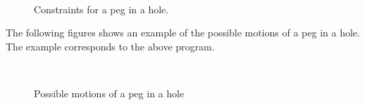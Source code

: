 \begin{figure}[h]
\mbox{
\epsfxsize=7.5cm
}
\mbox{
\epsfxsize=7.5cm
}
\mbox{
\epsfxsize=7.5cm
}
\mbox{
\epsfxsize=7.5cm
}
\caption{Constraints for a peg in a hole.}
\label{fig:peg-in-hole}
\end{figure}

\clearpage

The following figures shows an example of the possible motions
of a peg in a hole.
The example corresponds to the above program.\\

\begin{figure}[h]
\begin{center}
\mbox{
\epsfxsize=7.5cm
}
\mbox{
\epsfxsize=7.5cm
}
\mbox{
\epsfxsize=7.5cm
}
\mbox{
\epsfxsize=7.5cm
}
\end{center}
\caption{Possible motions of a peg in a hole}
\label{fig:peg-in-a-hole}
\end{figure}

\clearpage
